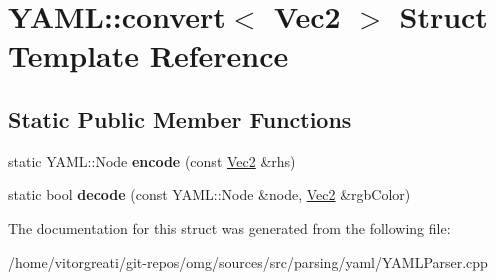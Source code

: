 \hypertarget{struct_y_a_m_l_1_1convert_3_01_vec2_01_4}{}\section{Y\+A\+ML\+::convert$<$ Vec2 $>$ Struct Template Reference}
\label{struct_y_a_m_l_1_1convert_3_01_vec2_01_4}
\subsection*{Static Public Member Functions}
\begin{DoxyCompactItemize}
\item 
\mbox{\label{struct_y_a_m_l_1_1convert_3_01_vec2_01_4_a1cd8297ee1bd488e0a4cfa5d03a5d793}} 
static Y\+A\+M\+L\+::\+Node {\bfseries encode} (const \mbox{\hyperlink{namespaceomg_aefe4804ccbaed61b5dd699b449b31150}{Vec2}} \&rhs)
\item 
\mbox{\label{struct_y_a_m_l_1_1convert_3_01_vec2_01_4_ab3d8ac9c29105104165c90cd3da3188d}} 
static bool {\bfseries decode} (const Y\+A\+M\+L\+::\+Node \&node, \mbox{\hyperlink{namespaceomg_aefe4804ccbaed61b5dd699b449b31150}{Vec2}} \&rgb\+Color)
\end{DoxyCompactItemize}


The documentation for this struct was generated from the following file\+:\begin{DoxyCompactItemize}
\item 
/home/vitorgreati/git-\/repos/omg/sources/src/parsing/yaml/Y\+A\+M\+L\+Parser.\+cpp\end{DoxyCompactItemize}

